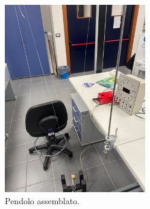 \documentclass[11pt]{article}
\begin{document}
\begin{figure}[H]
  \centering
  \includegraphics[width=0.55\textwidth]{pendolo.jpg}
  \caption{Pendolo assemblato.}
\end{figure}
\begin{figure}[H]
  \centering
  \hspace{0.5cm} %
  \label{fig:due_immagini}
\end{figure}
\end{document}
